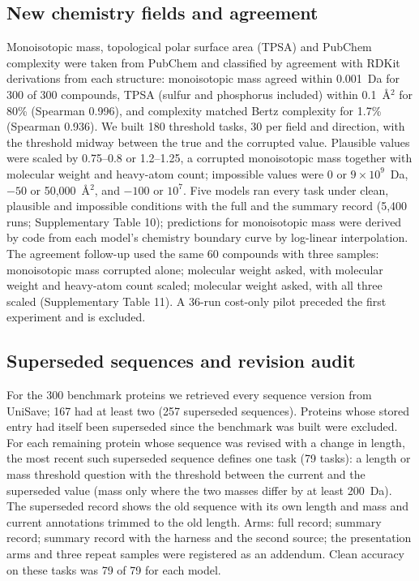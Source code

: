 \subsection*{New chemistry fields and agreement}
Monoisotopic mass, topological polar surface area (TPSA) and PubChem complexity were taken from PubChem and classified by agreement with RDKit derivations from each structure: monoisotopic mass agreed within 0.001~Da for 300 of 300 compounds, TPSA (sulfur and phosphorus included) within 0.1~\AA$^2$ for 80\% (Spearman 0.996), and complexity matched Bertz complexity for 1.7\% (Spearman 0.936). We built 180 threshold tasks, 30 per field and direction, with the threshold midway between the true and the corrupted value. Plausible values were scaled by 0.75--0.8 or 1.2--1.25, a corrupted monoisotopic mass together with molecular weight and heavy-atom count; impossible values were 0 or $9\times10^{9}$~Da, $-50$ or 50,000~\AA$^2$, and $-100$ or $10^{7}$. Five models ran every task under clean, plausible and impossible conditions with the full and the summary record (5,400 runs; Supplementary Table 10); predictions for monoisotopic mass were derived by code from each model's chemistry boundary curve by log-linear interpolation. The agreement follow-up used the same 60 compounds with three samples: monoisotopic mass corrupted alone; molecular weight asked, with molecular weight and heavy-atom count scaled; molecular weight asked, with all three scaled (Supplementary Table 11). A 36-run cost-only pilot preceded the first experiment and is excluded.

\subsection*{Superseded sequences and revision audit}
For the 300 benchmark proteins we retrieved every sequence version from UniSave; 167 had at least two (257 superseded sequences). Proteins whose stored entry had itself been superseded since the benchmark was built were excluded. For each remaining protein whose sequence was revised with a change in length, the most recent such superseded sequence defines one task (79 tasks): a length or mass threshold question with the threshold between the current and the superseded value (mass only where the two masses differ by at least 200~Da). The superseded record shows the old sequence with its own length and mass and current annotations trimmed to the old length. Arms: full record; summary record; summary record with the harness and the second source; the presentation arms and three repeat samples were registered as an addendum. Clean accuracy on these tasks was 79 of 79 for each model.

